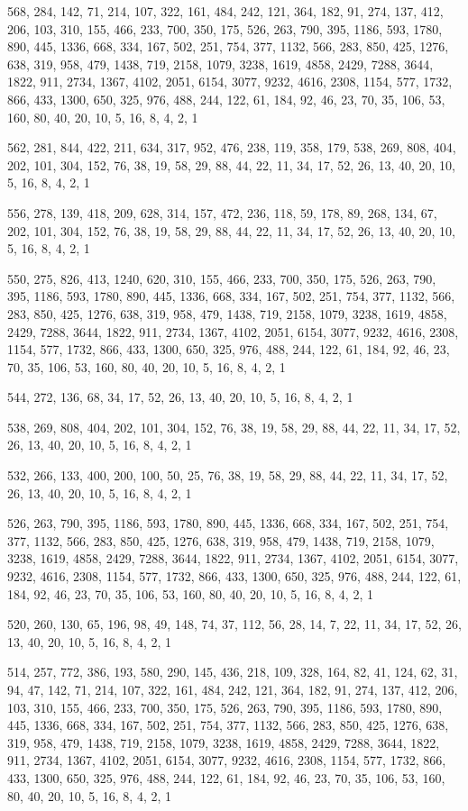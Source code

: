 \documentclass[12pt]{article}
\begin{document}
568, 284, 142, 71, 214, 107, 322, 161, 484, 242, 121, 364, 182, 91, 274, 137, 412, 206, 103, 310, 155, 466, 233, 700, 350, 175, 526, 263, 790, 395, 1186, 593, 1780, 890, 445, 1336, 668, 334, 167, 502, 251, 754, 377, 1132, 566, 283, 850, 425, 1276, 638, 319, 958, 479, 1438, 719, 2158, 1079, 3238, 1619, 4858, 2429, 7288, 3644, 1822, 911, 2734, 1367, 4102, 2051, 6154, 3077, 9232, 4616, 2308, 1154, 577, 1732, 866, 433, 1300, 650, 325, 976, 488, 244, 122, 61, 184, 92, 46, 23, 70, 35, 106, 53, 160, 80, 40, 20, 10, 5, 16, 8, 4, 2, 1

562, 281, 844, 422, 211, 634, 317, 952, 476, 238, 119, 358, 179, 538, 269, 808, 404, 202, 101, 304, 152, 76, 38, 19, 58, 29, 88, 44, 22, 11, 34, 17, 52, 26, 13, 40, 20, 10, 5, 16, 8, 4, 2, 1

556, 278, 139, 418, 209, 628, 314, 157, 472, 236, 118, 59, 178, 89, 268, 134, 67, 202, 101, 304, 152, 76, 38, 19, 58, 29, 88, 44, 22, 11, 34, 17, 52, 26, 13, 40, 20, 10, 5, 16, 8, 4, 2, 1

550, 275, 826, 413, 1240, 620, 310, 155, 466, 233, 700, 350, 175, 526, 263, 790, 395, 1186, 593, 1780, 890, 445, 1336, 668, 334, 167, 502, 251, 754, 377, 1132, 566, 283, 850, 425, 1276, 638, 319, 958, 479, 1438, 719, 2158, 1079, 3238, 1619, 4858, 2429, 7288, 3644, 1822, 911, 2734, 1367, 4102, 2051, 6154, 3077, 9232, 4616, 2308, 1154, 577, 1732, 866, 433, 1300, 650, 325, 976, 488, 244, 122, 61, 184, 92, 46, 23, 70, 35, 106, 53, 160, 80, 40, 20, 10, 5, 16, 8, 4, 2, 1

544, 272, 136, 68, 34, 17, 52, 26, 13, 40, 20, 10, 5, 16, 8, 4, 2, 1

538, 269, 808, 404, 202, 101, 304, 152, 76, 38, 19, 58, 29, 88, 44, 22, 11, 34, 17, 52, 26, 13, 40, 20, 10, 5, 16, 8, 4, 2, 1

532, 266, 133, 400, 200, 100, 50, 25, 76, 38, 19, 58, 29, 88, 44, 22, 11, 34, 17, 52, 26, 13, 40, 20, 10, 5, 16, 8, 4, 2, 1

526, 263, 790, 395, 1186, 593, 1780, 890, 445, 1336, 668, 334, 167, 502, 251, 754, 377, 1132, 566, 283, 850, 425, 1276, 638, 319, 958, 479, 1438, 719, 2158, 1079, 3238, 1619, 4858, 2429, 7288, 3644, 1822, 911, 2734, 1367, 4102, 2051, 6154, 3077, 9232, 4616, 2308, 1154, 577, 1732, 866, 433, 1300, 650, 325, 976, 488, 244, 122, 61, 184, 92, 46, 23, 70, 35, 106, 53, 160, 80, 40, 20, 10, 5, 16, 8, 4, 2, 1

520, 260, 130, 65, 196, 98, 49, 148, 74, 37, 112, 56, 28, 14, 7, 22, 11, 34, 17, 52, 26, 13, 40, 20, 10, 5, 16, 8, 4, 2, 1

514, 257, 772, 386, 193, 580, 290, 145, 436, 218, 109, 328, 164, 82, 41, 124, 62, 31, 94, 47, 142, 71, 214, 107, 322, 161, 484, 242, 121, 364, 182, 91, 274, 137, 412, 206, 103, 310, 155, 466, 233, 700, 350, 175, 526, 263, 790, 395, 1186, 593, 1780, 890, 445, 1336, 668, 334, 167, 502, 251, 754, 377, 1132, 566, 283, 850, 425, 1276, 638, 319, 958, 479, 1438, 719, 2158, 1079, 3238, 1619, 4858, 2429, 7288, 3644, 1822, 911, 2734, 1367, 4102, 2051, 6154, 3077, 9232, 4616, 2308, 1154, 577, 1732, 866, 433, 1300, 650, 325, 976, 488, 244, 122, 61, 184, 92, 46, 23, 70, 35, 106, 53, 160, 80, 40, 20, 10, 5, 16, 8, 4, 2, 1
\end{document}
